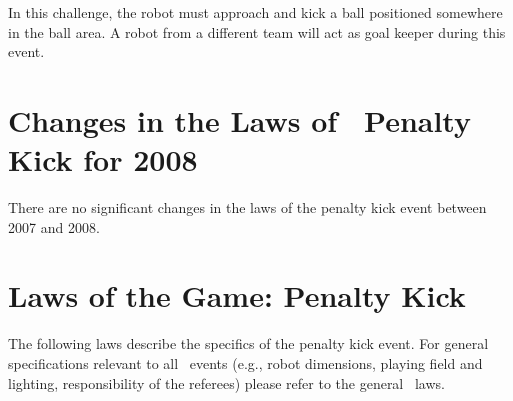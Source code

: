 \documentclass[12pt]{hurocup}
\begin{document}
In this challenge, the robot must approach and kick a ball positioned
somewhere in the ball area. A robot from a different team will act as
goal keeper during this event.

\section{Changes in the Laws of \HuroCup\ Penalty Kick for 2008}

There are no significant changes in the laws of the penalty kick event
between 2007 and 2008.

\section{Laws of the Game: Penalty Kick}
\label{sec:laws-penalty-kicks}

The following laws describe the specifics of the penalty kick event. For
general specifications relevant to all \HuroCup\ events (e.g., robot
dimensions, playing field and lighting, responsibility of the
referees) please refer to the general \HuroCup\ laws.

\label{pk-field}
\end{document}

